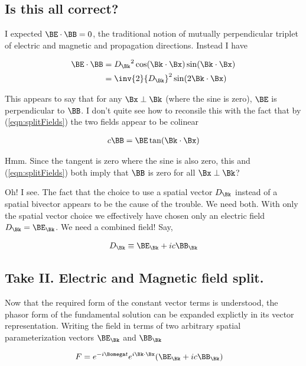 \subsection{Is this all correct?}

I expected $\BE \cdot \BB = 0$, the traditional notion of mutually perpendicular triplet of electric and magnetic and propagation directions.
Instead I have

\begin{align*}
\BE \cdot \BB 
&= {D_\Bk}^2 \cos(\Bk \cdot \Bx) \sin(\Bk \cdot \Bx) \\
&= \inv{2} {D_\Bk}^2 \sin( 2 \Bk \cdot \Bx) 
\end{align*}

This appears to say that for any $\Bx \perp \Bk$ (where the sine is zero), $\BE$ is perpendicular to $\BB$.  I don't quite see how to reconsile this with the fact that by 
(\ref{eqn:splitFields})
the two fields appear to be colinear

\begin{align*}
c \BB = \BE \tan(\Bk \cdot \Bx)
\end{align*}

Hmm.  Since the tangent is zero where the sine is also zero, this and (\ref{eqn:splitFields}) both imply that $\BB$ is zero for all $\Bx \perp \Bk$?

Oh!  I see.  The fact that the choice to use a spatial vector $D_\Bk$ instead of a spatial bivector appears to be the cause of the trouble.  We need
both.  With only the spatial vector choice we effectively have chosen only an electric field $D_\Bk = \BE_\Bk$.  We need a combined field!  Say,

\begin{align}
D_\Bk \equiv \BE_\Bk + i c \BB_\Bk
\end{align}

\subsection{Take II.  Electric and Magnetic field split.}

Now that the required form of the constant vector terms is understood, the
phasor form of the fundamental solution can be expanded explictly in its
vector representation.  Writing the field in terms of two arbitrary spatial
parameterization vectors $\BE_\Bk$ and $\BB_\Bk$

\begin{align}\label{eqn:phasor}
F &= e^{-i\Bomega t} e^{i \Bk \cdot \Bx} (\BE_\Bk + i c \BB_\Bk) 
\end{align}

